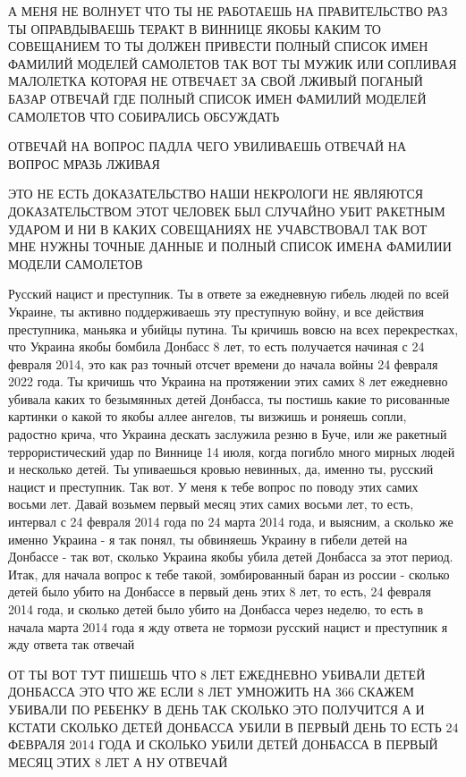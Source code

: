 А МЕНЯ НЕ ВОЛНУЕТ ЧТО ТЫ НЕ РАБОТАЕШЬ НА ПРАВИТЕЛЬСТВО РАЗ ТЫ ОПРАВДЫВАЕШЬ
ТЕРАКТ В ВИННИЦЕ ЯКОБЫ КАКИМ ТО СОВЕЩАНИЕМ ТО ТЫ ДОЛЖЕН ПРИВЕСТИ ПОЛНЫЙ СПИСОК
ИМЕН ФАМИЛИЙ МОДЕЛЕЙ САМОЛЕТОВ ТАК ВОТ ТЫ МУЖИК ИЛИ СОПЛИВАЯ МАЛОЛЕТКА КОТОРАЯ
НЕ ОТВЕЧАЕТ ЗА СВОЙ ЛЖИВЫЙ ПОГАНЫЙ БАЗАР ОТВЕЧАЙ ГДЕ ПОЛНЫЙ СПИСОК ИМЕН ФАМИЛИЙ
МОДЕЛЕЙ САМОЛЕТОВ ЧТО СОБИРАЛИСЬ ОБСУЖДАТЬ

ОТВЕЧАЙ НА ВОПРОС ПАДЛА ЧЕГО УВИЛИВАЕШЬ ОТВЕЧАЙ НА ВОПРОС МРАЗЬ ЛЖИВАЯ

ЭТО НЕ ЕСТЬ ДОКАЗАТЕЛЬСТВО НАШИ НЕКРОЛОГИ НЕ ЯВЛЯЮТСЯ ДОКАЗАТЕЛЬСТВОМ ЭТОТ
ЧЕЛОВЕК БЫЛ СЛУЧАЙНО УБИТ РАКЕТНЫМ УДАРОМ И НИ В КАКИХ СОВЕЩАНИЯХ НЕ
УЧАВСТВОВАЛ ТАК ВОТ МНЕ НУЖНЫ ТОЧНЫЕ ДАННЫЕ И ПОЛНЫЙ СПИСОК ИМЕНА ФАМИЛИИ
МОДЕЛИ САМОЛЕТОВ

Русский нацист и преступник. Ты в ответе за ежедневную гибель людей по всей
Украине, ты активно поддерживаешь эту преступную войну, и все действия
преступника, маньяка и убийцы путина.  Ты кричишь вовсю на всех перекрестках,
что Украина якобы бомбила Донбасс 8 лет, то есть получается начиная с 24
февраля 2014, это как раз точный отсчет времени до начала войны 24 февраля 2022
года. Ты кричишь что Украина на протяжении этих самих 8 лет ежедневно убивала
каких то безымянных детей Донбасса, ты постишь какие то рисованные картинки о
какой то якобы аллее ангелов, ты визжишь и роняешь сопли, радостно крича, что
Украина дескать заслужила резню в Буче, или же ракетный террористический удар
по Виннице 14 июля, когда погибло много мирных людей и несколько детей. Ты
упиваешься кровью невинных, да, именно ты, русский нацист и преступник. Так
вот. У меня к тебе вопрос по поводу этих самих восьми лет.  Давай возьмем
первый месяц этих самих восьми лет, то есть, интервал с 24 февраля 2014 года по
24 марта 2014 года, и выясним, а сколько же именно Украина - я так понял, ты
обвиняешь Украину в гибели детей на Донбассе - так вот, сколько Украина якобы
убила детей Донбасса за этот период. Итак, для начала вопрос к тебе такой,
зомбированный баран из россии - сколько детей было убито на Донбассе в первый
день этих 8 лет, то есть, 24 февраля 2014 года, и сколько детей было убито на
Донбасса через неделю, то есть в начала марта 2014 года я жду ответа не тормози
русский нацист и преступник я жду ответа так отвечай

ОТ ТЫ ВОТ ТУТ ПИШЕШЬ ЧТО 8 ЛЕТ ЕЖЕДНЕВНО УБИВАЛИ ДЕТЕЙ ДОНБАССА ЭТО ЧТО
ЖЕ ЕСЛИ 8 ЛЕТ УМНОЖИТЬ НА 366 СКАЖЕМ УБИВАЛИ ПО РЕБЕНКУ В ДЕНЬ ТАК СКОЛЬКО ЭТО
ПОЛУЧИТСЯ А И КСТАТИ СКОЛЬКО ДЕТЕЙ ДОНБАССА УБИЛИ В ПЕРВЫЙ ДЕНЬ ТО ЕСТЬ 24
ФЕВРАЛЯ 2014 ГОДА И СКОЛЬКО УБИЛИ ДЕТЕЙ ДОНБАССА В ПЕРВЫЙ МЕСЯЦ ЭТИХ 8 ЛЕТ А НУ
ОТВЕЧАЙ
